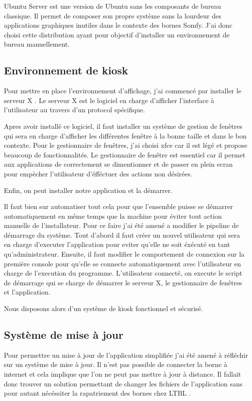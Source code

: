 Ubuntu Server est une version de Ubuntu sans les composants de bureau classique.
Il permet de composer son propre système sans la lourdeur des applications graphiques inutiles dans le contexte des bornes Somfy.
J'ai donc choisi cette distribution ayant pour objectif d'installer un environnement de bureau manuellement.

\subsection{Environnement de kiosk}

Pour mettre en place l'environnement d'affichage, j'ai commencé par installer le serveur X .
Le serveur X est le logiciel en charge d'afficher l'interface à l'utilisateur au travers d'un protocol spécifique.

Apres avoir installé ce logiciel, il faut installer un système de gestion de fenètres qui sera en charge d'afficher les différentes fenêtre à la bonne taille et dans le bon contexte.
Pour le gestionnaire de fenêtres, j'ai choisi xfce car il est légé et propose beaucoup de fonctionnalités.
Le gestionnaire de fenêtre est essentiel car il permet aux applications de correctement se dimentionner et de passer en plein ecran pour empècher l'utilisateur d'éfféctuer des actions non désirées.

Enfin, on peut installer notre application et la démarrer.

Il faut bien sur automatiser tout cela pour que l'ensemble puisse se démarrer automatiquement en même temps que la machine pour éviter tout action manuelle de l'installateur.
Pour ce faire j'ai été amené a modifier le pipeline de démarrage du système.
Tout d'abord il faut créer un nouvel utilisateur qui sera en charge d'executer l'application pour eviter qu'elle ne soit éxécuté en tant qu'administrateur.
Ensuite, il faut modifier le comportement de connexion sur la première console pour qu'elle se connecte automatiquement avec l'utilisateur en charge de l'execution du programme.
L'utilisateur connecté, on execute le script de démarrage qui se charge de démarrer le serveur X, le gestionnaire de fenêtres et l'application.

Nous disposons alors d'un système de kiosk fonctionnel et sécurisé.

\subsection{Système de mise à jour}

Pour permettre un mise à jour de l'application simplifiée j'ai été amené à réfléchir sur un système de mise à jour.
Il n'est pas possible de connecter la borne à internet et cela implique que l'on ne peut pas mettre à jour à distance.
Il fallait donc trouver un solution permettant de changer les fichiers de l'application sans pour autant nécéssiter la rapatriement des bornes chez LTBL .

